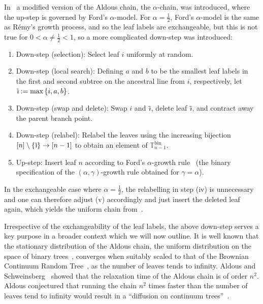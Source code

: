 \documentclass[a4paper, final]{amsart}
\theoremstyle{plain}
\theoremstyle{definition}
\newcommand{\T}{\mathbb{T}}
\DeclareMathOperator{\bin}{bin}
\DeclareMathOperator{\tildei}{\tilde{\textit{\i}}}
\begin{document}
In~\cite{forman2018projections, RefWorks:doc:5b4cbc93e4b07f5746e47014} a modified version of the Aldous chain, the $\alpha$-chain, was introduced, where the up-step is governed by Ford's $\alpha$-model.
For $\alpha = \frac{1}{2}$, Ford's $\alpha$-model is the same as R\'{e}my's growth process, and so the leaf labels are exchangeable, but this is not true for $0 < \alpha \neq \frac{1}{2} < 1$, so a more complicated down-step was introduced:
%
\begin{enumerate}
  \item Down-step (selection): Select leaf $i$ uniformly at random.
  \item Down-step (local search): Defining $a$ and $b$ to be the smallest leaf labels in the first and second subtree on the ancestral line from $i$, respectively, let $\tildei := \max\left\{ i, a, b \right\}$.
  \item Down-step (swap and delete): Swap $i$ and $\tildei$, delete leaf $\tildei$, and contract away the parent branch point.
  \item Down-step (relabel): Relabel the leaves using the increasing bijection $[n] \setminus \{\tildei\} \to [n-1]$ to obtain an element of $\T_{n-1}^{\bin}$.
  \item Up-step: Insert leaf $n$ according to Ford's $\alpha$-growth rule~\cite{RefWorks:doc:5b76ce32e4b0820c421f301d} (the binary specification of the $(\alpha, \gamma)$-growth rule obtained for $\gamma = \alpha$).
\end{enumerate}
%
In the exchangeable case where $\alpha = \frac{1}{2}$, the relabelling in step (iv) is unnecessary and one can therefore adjust (v) accordingly and just insert the deleted leaf again, which yields the uniform chain from~\cite{RefWorks:doc:5b4cbc93e4b07f5746e47014}.

Irrespective of the exchangeability of the leaf labels, the above down-step serves a key purpose in a broader context which we will now outline.
It is well known that the stationary distribution of the Aldous chain, the uniform distribution on the space of binary trees~\cite{RefWorks:doc:5b4cbc14e4b04428cc72cf41}, converges when suitably scaled to that of the Brownian Continuum Random Tree~\cite{RefWorks:doc:5b72ecc3e4b0bc0f31737130}, as the number of leaves tends to infinity.
Aldous and Schweinsberg~\cite{RefWorks:doc:5b4cbc14e4b04428cc72cf41,RefWorks:doc:5b4cbc43e4b0185a9132aee9} showed that the relaxation time of the Aldous chain is of order $n^2$.
Aldous conjectured that running the chain $n^2$ times faster than the number of leaves tend to infinity would result in a “diffusion on continuum trees”~\cite{aldousweb}.
\end{document}

